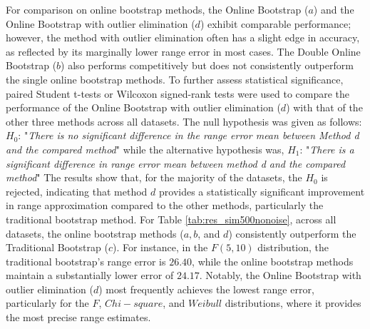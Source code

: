 \documentclass[a4paper,fleqn]{cas-dc}
\begin{document}
For comparison on online bootstrap methods, the Online Bootstrap ($a$) and the Online Bootstrap 
with outlier elimination ($d$) %
exhibit comparable performance; however, the method with outlier elimination often has a slight edge 
in accuracy, as reflected by its marginally lower range error in most cases. 
The Double Online Bootstrap ($b$) also performs competitively but does not consistently outperform the single 
online bootstrap methods. To further assess statistical significance, paired Student t-tests or Wilcoxon signed-rank tests were used to 
compare the performance of the Online Bootstrap with outlier elimination ($d$) with that of the other three methods 
across all datasets. The null hypothesis was given as follows: $H_0$: "{\it There is no significant 
difference in the range error mean between Method d and the compared method}" while the alternative hypothesis was, 
$H_1$: "{\it There is a significant difference in range error mean 
between method d and the compared method}" The results show that, for the majority
of the datasets, the $H_0$ is rejected, indicating that method $d$ provides a statistically  
significant improvement in range approximation compared to the other methods, particularly 
the traditional bootstrap method. For Table \ref{tab:res_sim500nonoise}, across all datasets, 
the online bootstrap methods ($a, b$, and $d$) consistently outperform the Traditional Bootstrap ($c$). 
For instance, in the $F(5,10)$ distribution, the traditional bootstrap's range error is $26.40$, 
while the online bootstrap methods maintain a substantially lower error of $24.17$. Notably, the Online Bootstrap 
with outlier elimination ($d$) most frequently  achieves the lowest range 
error, particularly for the $F$, $Chi-square$, and $Weibull$ distributions, where it 
provides the most precise range estimates.
\end{document}
